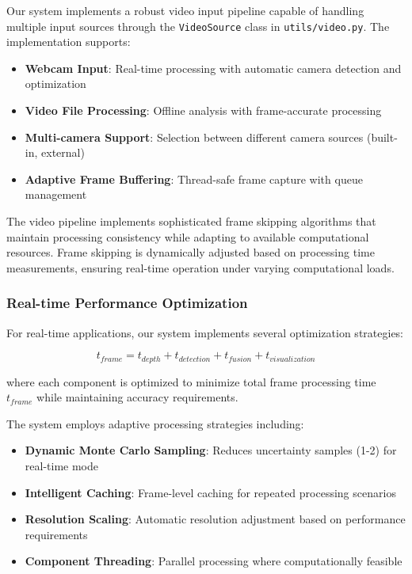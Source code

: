 \documentclass[12pt,oneside]{book}
\begin{document}
Our system implements a robust video input pipeline capable of handling multiple input sources through the \texttt{VideoSource} class in \texttt{utils/video.py}. The implementation supports:

\begin{itemize}
\item \textbf{Webcam Input}: Real-time processing with automatic camera detection and optimization
\item \textbf{Video File Processing}: Offline analysis with frame-accurate processing
\item \textbf{Multi-camera Support}: Selection between different camera sources (built-in, external)
\item \textbf{Adaptive Frame Buffering}: Thread-safe frame capture with queue management
\end{itemize}

The video pipeline implements sophisticated frame skipping algorithms that maintain processing consistency while adapting to available computational resources. Frame skipping is dynamically adjusted based on processing time measurements, ensuring real-time operation under varying computational loads.

\subsubsection{Real-time Performance Optimization}

For real-time applications, our system implements several optimization strategies:

\begin{equation}
t_{frame} = t_{depth} + t_{detection} + t_{fusion} + t_{visualization}
\label{eq:frame_timing}
\end{equation}

where each component is optimized to minimize total frame processing time $t_{frame}$ while maintaining accuracy requirements.

The system employs adaptive processing strategies including:
\begin{itemize}
\item \textbf{Dynamic Monte Carlo Sampling}: Reduces uncertainty samples (1-2) for real-time mode
\item \textbf{Intelligent Caching}: Frame-level caching for repeated processing scenarios
\item \textbf{Resolution Scaling}: Automatic resolution adjustment based on performance requirements
\item \textbf{Component Threading}: Parallel processing where computationally feasible
\end{itemize}
\end{document}
